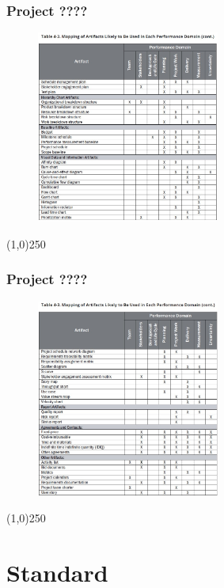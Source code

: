 \begin{frame}
\frametitle{Project ????}
 \begin{figure}
    \centering
        \includegraphics[width = 6cm]{../images/guide/Table4-3b.jpg}
    \label{guideTable:4-3b}
 \end{figure}
\end{frame}
\begin{center}\line(1,0){250}\end{center}


\begin{frame}
\frametitle{Project ????}
 \begin{figure}
    \centering
        \includegraphics[width = 6cm]{../images/guide/Table4-3c.jpg}
    \label{guideTable:4-3c}
 \end{figure}
\end{frame}
\begin{center}\line(1,0){250}\end{center}





\section{Standard}


